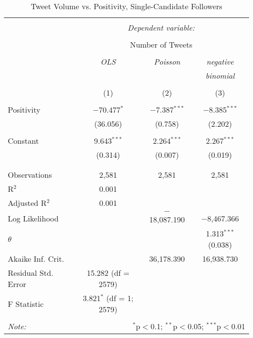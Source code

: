 \begin{table}[!htbp] \centering 
  \caption{Tweet Volume vs. Positivity, Single-Candidate Followers} 
  \label{} 
    \begin{tabular}{@{\extracolsep{5pt}}lccc} 
    \\[-1.8ex]\hline 
    \hline \\[-1.8ex] 
     & \multicolumn{3}{c}{\textit{Dependent variable:}} \\ 
    \cline{2-4} 
    \\[-1.8ex] & \multicolumn{3}{c}{Number of Tweets} \\ 
    \\[-1.8ex] & \textit{OLS} & \textit{Poisson} & \textit{negative} \\ 
     & \textit{} & \textit{} & \textit{binomial} \\ 
    \\[-1.8ex] & (1) & (2) & (3)\\ 
    \hline \\[-1.8ex] 
     Positivity & $-$70.477$^{*}$ & $-$7.387$^{***}$ & $-$8.385$^{***}$ \\ 
      & (36.056) & (0.758) & (2.202) \\ 
      & & & \\ 
     Constant & 9.643$^{***}$ & 2.264$^{***}$ & 2.267$^{***}$ \\ 
      & (0.314) & (0.007) & (0.019) \\ 
      & & & \\ 
    \hline \\[-1.8ex] 
    Observations & 2,581 & 2,581 & 2,581 \\ 
    R$^{2}$ & 0.001 &  &  \\ 
    Adjusted R$^{2}$ & 0.001 &  &  \\ 
    Log Likelihood &  & $-$18,087.190 & $-$8,467.366 \\ 
    $\theta$ &  &  & 1.313$^{***}$  (0.038) \\ 
    Akaike Inf. Crit. &  & 36,178.390 & 16,938.730 \\ 
    Residual Std. Error & 15.282 (df = 2579) &  &  \\ 
    F Statistic & 3.821$^{*}$ (df = 1; 2579) &  &  \\ 
    \hline 
    \hline \\[-1.8ex] 
    \textit{Note:}  & \multicolumn{3}{r}{$^{*}$p$<$0.1; $^{**}$p$<$0.05; $^{***}$p$<$0.01} \\ 
    \end{tabular} 
\end{table} 

